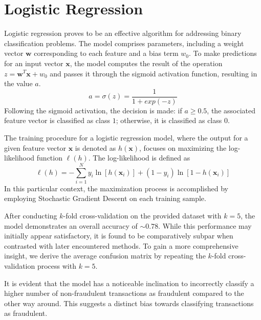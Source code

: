 \documentclass{article}
\begin{document}
\section{Logistic Regression}
Logistic regression proves to be an effective algorithm for addressing binary classification problems. The model comprises parameters, including a weight vector $\textbf{w}$ corresponding to each feature and a bias term $w_0$. To make predictions for an input vector $\textbf{x}$, the model computes the result of the operation $z = \textbf{w}^{T}\textbf{x} + w_0$ and passes it through the sigmoid activation function, resulting in the value $a$.
$$a=\sigma(z)=\frac{1}{1+exp(-z)}$$ Following the sigmoid activation, the decision is made: if $a \ge 0.5$, the associated feature vector is classified as class $1$; otherwise, it is classified as class $0$.

The training procedure for a logistic regression model, where the output for a given feature vector $\textbf{x}$ is denoted as $h(\textbf{x})$, focuses on maximizing the log-likelihood function $\ell(h)$. The log-likelihood is defined as $$\ell(h) = -\sum^{N}_{i=1} y_i \ln[h(\textbf{x}_i)] + (1 - y_i) \ln[1 - h(\textbf{x}_i)]$$In this particular context, the maximization process is accomplished by employing Stochastic Gradient Descent on each training sample.

After conducting $k$-fold cross-validation on the provided dataset with $k=5$, the model demonstrates an overall accuracy of $\sim 0.78$. While this performance may initially appear satisfactory, it is found to be comparatively subpar when contrasted with later encountered methods. To gain a more comprehensive insight, we derive the average confusion matrix by repeating the $k$-fold cross-validation process with $k=5$.
\begin{center}
\end{center}
It is evident that the model has a noticeable inclination to incorrectly classify a higher number of non-fraudulent transactions as fraudulent compared to the other way around. This suggests a distinct bias towards classifying transactions as fraudulent.
\\
\\
\end{document}
